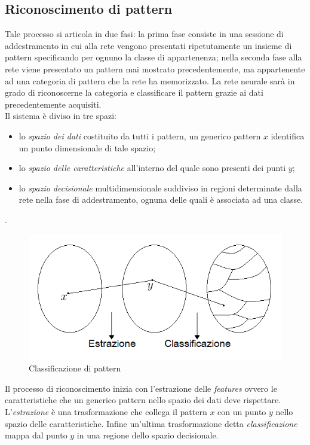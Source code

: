 \documentclass[12pt,a4paper,oneside]{book}
\begin{document}
		\subsection{Riconoscimento di pattern}
		
		Tale processo si articola in due fasi: la prima fase consiste in una sessione di addestramento in cui  alla rete vengono presentati ripetutamente un insieme di pattern specificando per ognuno la classe di appartenenza; nella seconda fase alla rete viene presentato un pattern mai mostrato precedentemente, ma appartenente ad una categoria di pattern che la rete ha memorizzato. La rete neurale sarà in grado di riconoscerne la categoria e classificare il pattern grazie ai dati precedentemente acquisiti.\\
		\clearpage
		Il sistema è diviso in tre spazi:\\
		
		\begin{itemize}
		\item lo \emph{spazio dei dati} costituito da tutti i pattern, un generico pattern $x$ identifica un punto dimensionale di tale spazio;
		\item lo \emph{spazio delle caratteristiche} all'interno del quale sono presenti dei punti $y$;
		\item lo \emph{spazio decisionale} multidimensionale suddiviso in regioni determinate dalla rete nella fase di addestramento, ognuna delle quali è associata ad una classe.
		\end{itemize}.
		
		\begin{figure}[h]
			\centering
			\includegraphics[width=0.8\linewidth]{IMMAGINI/classificazione}
			\caption{ Classificazione di pattern }
			\label{fig:classificazione}
		\end{figure}
		
		Il processo di riconoscimento inizia con l'estrazione delle \emph{features} ovvero le caratteristiche che un generico pattern nello spazio dei dati deve rispettare. L'\emph{estrazione} è una trasformazione che collega il pattern $x$ con un punto $y$ nello spazio delle caratteristiche. Infine un'ultima trasformazione detta \emph{classificazione} mappa dal punto $y$ in una regione dello spazio decisionale.\\
		
\end{document}
